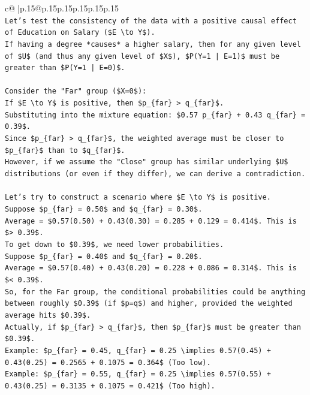 \documentclass{article}
\begin{document}
{\begin{supertabular}{c@{$\;$}|p{.15\linewidth}@{}p{.15\linewidth}p{.15\linewidth}p{.15\linewidth}p{.15\linewidth}p{.15\linewidth}}
{{{\\ 
\texttt{Let's test the consistency of the data with a positive causal effect of Education on Salary (\$E \textbackslash{}to Y\$).} \\
\texttt{If having a degree *causes* a higher salary, then for any given level of \$U\$ (and thus any given level of \$X\$), \$P(Y=1 | E=1)\$ must be greater than \$P(Y=1 | E=0)\$.} \\
\\ 
\texttt{Consider the "Far" group (\$X=0\$):} \\
\texttt{If \$E \textbackslash{}to Y\$ is positive, then \$p\_\{far\} > q\_\{far\}\$.} \\
\texttt{Substituting into the mixture equation: \$0.57 p\_\{far\} + 0.43 q\_\{far\} = 0.39\$.} \\
\texttt{Since \$p\_\{far\} > q\_\{far\}\$, the weighted average must be closer to \$p\_\{far\}\$ than to \$q\_\{far\}\$.} \\
\texttt{However, if we assume the "Close" group has similar underlying \$U\$ distributions (or even if they differ), we can derive a contradiction.} \\
\\ 
\texttt{Let's try to construct a scenario where \$E \textbackslash{}to Y\$ is positive.} \\
\texttt{Suppose \$p\_\{far\} = 0.50\$ and \$q\_\{far\} = 0.30\$.} \\
\texttt{Average = \$0.57(0.50) + 0.43(0.30) = 0.285 + 0.129 = 0.414\$. This is \$> 0.39\$.} \\
\texttt{To get down to \$0.39\$, we need lower probabilities.} \\
\texttt{Suppose \$p\_\{far\} = 0.40\$ and \$q\_\{far\} = 0.20\$.} \\
\texttt{Average = \$0.57(0.40) + 0.43(0.20) = 0.228 + 0.086 = 0.314\$. This is \$< 0.39\$.} \\
\texttt{So, for the Far group, the conditional probabilities could be anything between roughly \$0.39\$ (if \$p=q\$) and higher, provided the weighted average hits \$0.39\$.} \\
\texttt{Actually, if \$p\_\{far\} > q\_\{far\}\$, then \$p\_\{far\}\$ must be greater than \$0.39\$.} \\
\texttt{Example: \$p\_\{far\} = 0.45, q\_\{far\} = 0.25 \textbackslash{}implies 0.57(0.45) + 0.43(0.25) = 0.2565 + 0.1075 = 0.364\$ (Too low).} \\
\texttt{Example: \$p\_\{far\} = 0.55, q\_\{far\} = 0.25 \textbackslash{}implies 0.57(0.55) + 0.43(0.25) = 0.3135 + 0.1075 = 0.421\$ (Too high).} \\
}}}
\end{supertabular}}
\end{document}
